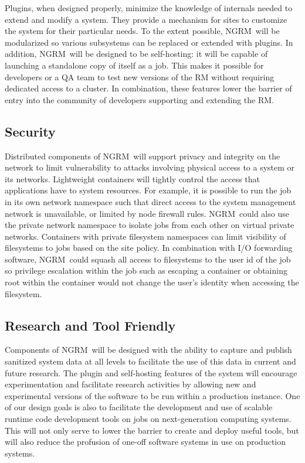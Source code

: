 \documentclass{article}
\newcommand{\ngrm}{NGRM}
\begin{document}
Plugins, when designed properly, minimize the knowledge of internals
needed to extend and modify a system. They provide a mechanism for
sites to customize the system for their particular needs. To the extent
possible, \ngrm\ will be modularized so various subsystems can be replaced
or extended with plugins.
In addition, \ngrm\ will be designed to be self-hosting: it will
be capable of launching a standalone copy of itself as a job. This makes
it possible for developers or a QA team to test new versions of the
RM without requiring dedicated access to a cluster.
In combination, these features lower the barrier of entry into the
community of developers supporting and extending the RM.

\subsection{Security}

Distributed components of \ngrm\ will support privacy and integrity on
the network to limit vulnerability to attacks involving physical access
to a system or its networks.
Lightweight containers will tightly control the access that
applications have to system resources. For example, it is possible to
run the job in its own network namespace such that direct access to the
system management network is unavailable, or limited by node firewall
rules. \ngrm\ could also use the private network namespace to isolate
jobs from each other on virtual private networks.  
Containers with private filesystem namespaces can limit visibility of
filesystems to jobs based on the site policy. 
%
In combination with I/O
forwarding software, \ngrm\ could squash all access to filesystems to
the user id of the job so privilege escalation within the job such as
escaping a container or obtaining root within the container would not
change the user's identity when accessing the filesystem.

\subsection{Research and Tool Friendly}

Components of \ngrm\ will be designed with the ability to capture and
publish sanitized system data at all levels to facilitate the use of
this data in current and future research.  The plugin and self-hosting
features of the system will encourage experimentation and
facilitate research activities by allowing new and experimental
versions of the software to be run within a production instance.
One of our design goals is also to facilitate the
development and use of scalable runtime code development tools 
on jobs on next-generation computing systems. This will not only serve 
to lower the barrier to create and deploy useful tools, but will also reduce the
profusion of one-off software systems in use on production systems.
\end{document}
